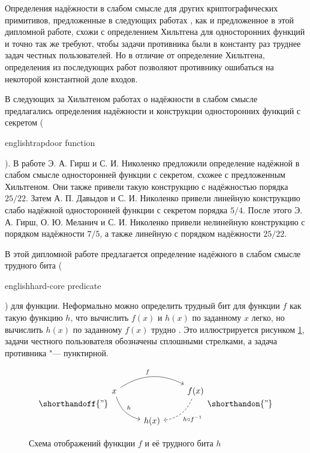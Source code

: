 \documentclass[oneside, a4paper]{article}
\theoremstyle{definition}
\theoremstyle{remark}
\begin{document}
Определения надёжности в слабом смысле для других криптографических примитивов,
предложенные в следующих работах \cite{HN09,DN11,hirsch_milanich_nikolenko},
как и предложенное в этой дипломной работе, схожи с определением Хильтгена для
односторонних функций и точно так же требуют, чтобы задачи противника были в
константу раз труднее задач честных пользователей. Но в отличие от определение
Хильтгена, определения из последующих работ позволяют противнику ошибаться на
некоторой константной доле входов.

В следующих за Хильтгеном работах о надёжности в слабом смысле предлагались
определения надёжности и конструкции односторонних функций с секретом
(\begin{foreignlanguage}{english}trapdoor function\end{foreignlanguage}). В
работе \cite{HN09} Э. А. Гирш и С. И. Николенко предложили определение надёжной
в слабом смысле односторонней функции с секретом, схожее с предложенным
Хильтгеном. Они также привели такую конструкцию с надёжностью порядка $25/22$.
Затем \cite{DN11} А. П. Давыдов и С. И. Николенко привели линейную конструкцию
слабо надёжной односторонней функции с секретом порядка $5/4$. После этого Э. А.
Гирш, О. Ю. Меланич и С. И. Николенко \cite{hirsch_milanich_nikolenko} привели
нелинейную конструкцию с порядком надёжности $7/5$, а также линейную с порядком
надёжности $25/22$.

В этой дипломной работе предлагается определение надёжного в слабом
смысле трудного бита (\begin{foreignlanguage}{english}hard-core
predicate\end{foreignlanguage}) для функции. Неформально можно определить
трудный бит для функции $f$ как такую функцию $h$, что вычислить $f(x)$ и
$h(x)$ по заданному $x$ легко, но вычислить $h(x)$ по заданному $f(x)$ трудно
\cite{goldreich}. Это иллюстрируется рисунком \ref{fig_hp}, задачи честного
пользователя обозначены сплошными стрелками, а задача противника "---
пунктирной.

\begin{figure}[h]
\[
\shorthandoff{"}
\begin{tikzcd}
x \arrow[rr, bend left, "f"] \arrow[rd, bend right, "h"] & ~ & f(x) \arrow[ld, bend left, dashrightarrow, "h \circ f^{-1}"] \\
~ & h(x) & ~
\end{tikzcd}
\shorthandon{"}
\]
\caption{Схема отображений функции $f$ и её трудного бита $h$}
\label{fig_hp}
\end{figure}
\end{document}
